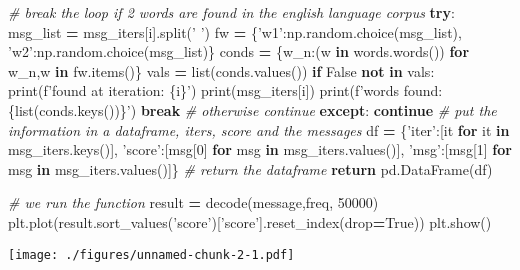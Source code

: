 \documentclass[]{article}
\newenvironment{Shaded}{\begin{snugshade}}{\end{snugshade}}
\newcommand{\BuiltInTok}[1]{#1}
\newcommand{\CommentTok}[1]{\textcolor[rgb]{0.56,0.35,0.01}{\textit{#1}}}
\newcommand{\ControlFlowTok}[1]{\textcolor[rgb]{0.13,0.29,0.53}{\textbf{#1}}}
\newcommand{\DecValTok}[1]{\textcolor[rgb]{0.00,0.00,0.81}{#1}}
\newcommand{\KeywordTok}[1]{\textcolor[rgb]{0.13,0.29,0.53}{\textbf{#1}}}
\newcommand{\NormalTok}[1]{#1}
\newcommand{\OperatorTok}[1]{\textcolor[rgb]{0.81,0.36,0.00}{\textbf{#1}}}
\newcommand{\SpecialCharTok}[1]{\textcolor[rgb]{0.00,0.00,0.00}{#1}}
\newcommand{\SpecialStringTok}[1]{\textcolor[rgb]{0.31,0.60,0.02}{#1}}
\newcommand{\StringTok}[1]{\textcolor[rgb]{0.31,0.60,0.02}{#1}}
\newcommand{\VariableTok}[1]{\textcolor[rgb]{0.00,0.00,0.00}{#1}}
\begin{document}
\begin{Shaded}
\begin{Highlighting}[]
        \CommentTok{# break the loop if 2 words are found in the english language corpus}
        \ControlFlowTok{try}\NormalTok{:}
\NormalTok{            msg_list }\OperatorTok{=}\NormalTok{ msg_iters[i].split(}\StringTok{' '}\NormalTok{)}
\NormalTok{            fw }\OperatorTok{=}\NormalTok{ \{}\StringTok{'w1'}\NormalTok{:np.random.choice(msg_list),}
                  \StringTok{'w2'}\NormalTok{:np.random.choice(msg_list)\}}
\NormalTok{            conds }\OperatorTok{=}\NormalTok{ \{w_n:(w }\KeywordTok{in}\NormalTok{ words.words()) }\ControlFlowTok{for}\NormalTok{ w_n,w }\KeywordTok{in}\NormalTok{ fw.items()\}}
\NormalTok{            vals }\OperatorTok{=} \BuiltInTok{list}\NormalTok{(conds.values())}
            \ControlFlowTok{if} \VariableTok{False} \KeywordTok{not} \KeywordTok{in}\NormalTok{ vals:}
                \BuiltInTok{print}\NormalTok{(}\SpecialStringTok{f'found at iteration: }\SpecialCharTok{\{i\}}\SpecialStringTok{'}\NormalTok{)}
                \BuiltInTok{print}\NormalTok{(msg_iters[i])}
                \BuiltInTok{print}\NormalTok{(}\SpecialStringTok{f'words found: }\SpecialCharTok{\{}\BuiltInTok{list}\NormalTok{(conds.keys())}\SpecialCharTok{\}}\SpecialStringTok{'}\NormalTok{)}
                \ControlFlowTok{break}
        \CommentTok{# otherwise continue}
        \ControlFlowTok{except}\NormalTok{:}
            \ControlFlowTok{continue}
    \CommentTok{# put the information in a dataframe, iters, score and the messages}
\NormalTok{    df }\OperatorTok{=}\NormalTok{ \{}\StringTok{'iter'}\NormalTok{:[it }\ControlFlowTok{for}\NormalTok{ it }\KeywordTok{in}\NormalTok{ msg_iters.keys()],}
          \StringTok{'score'}\NormalTok{:[msg[}\DecValTok{0}\NormalTok{] }\ControlFlowTok{for}\NormalTok{ msg }\KeywordTok{in}\NormalTok{ msg_iters.values()],}
          \StringTok{'msg'}\NormalTok{:[msg[}\DecValTok{1}\NormalTok{] }\ControlFlowTok{for}\NormalTok{ msg }\KeywordTok{in}\NormalTok{ msg_iters.values()]\}}
    \CommentTok{# return the dataframe}
    \ControlFlowTok{return}\NormalTok{ pd.DataFrame(df)}

\CommentTok{# we run the function}
\NormalTok{result }\OperatorTok{=}\NormalTok{ decode(message,freq, }\DecValTok{50000}\NormalTok{)}
\NormalTok{plt.plot(result.sort_values(}\StringTok{'score'}\NormalTok{)[}\StringTok{'score'}\NormalTok{].reset_index(drop}\OperatorTok{=}\VariableTok{True}\NormalTok{))}
\NormalTok{plt.show()}
\end{Highlighting}
\end{Shaded}

\texttt{[image: ./figures/unnamed-chunk-2-1.pdf]}
\end{document}
